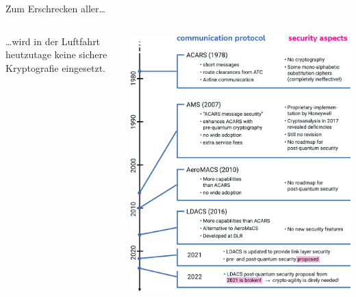 \begin{frame}[c]{Zum Erschrecken aller…}
  \begin{columns}[fullwidth,c]
    \begin{column}{.5\linewidth}

        \footnotesize
        …wird in der Luftfahrt heutzutage keine sichere Kryptografie eingesetzt. 
    \end{column}%
    \begin{column}{.5\linewidth}
      \includegraphics[width=.92\linewidth]{graphics/history of cryptography in avionics}
    \end{column}
  \end{columns}
\end{frame}


